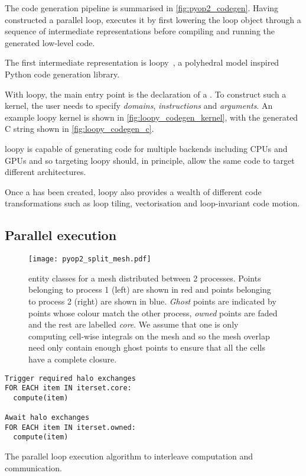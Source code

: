 \documentclass[thesis]{subfiles}
\begin{document}
The code generation pipeline is summarised in \cref{fig:pyop2_codegen}.
Having constructed a parallel loop,  executes it by first lowering the loop object through a sequence of intermediate representations before compiling and running the generated low-level code.

The first intermediate representation is loopy~\cite{klocknerLooPyTransformationbased2014}, a polyhedral model inspired Python code generation library.

With loopy, the main entry point is the declaration of a .
To construct such a kernel, the user needs to specify \textit{domains}, \textit{instructions} and \textit{arguments}.
An example loopy kernel is shown in \cref{fig:loopy_codegen_kernel}, with the generated C string shown in \cref{fig:loopy_codegen_c}.

loopy is capable of generating code for multiple backends including CPUs and GPUs and so  targeting loopy should, in principle, allow the same  code to target different architectures.

Once a  has been created, loopy also provides a wealth of different code transformations such as loop tiling, vectorisation and loop-invariant code motion.

\subsection{Parallel execution}
\label{sec:pyop2_parallel}

\begin{figure}
  \centering
  \texttt{[image: pyop2\_split\_mesh.pdf]}
  \caption{
     entity classes for a mesh distributed between 2 processes.
    Points belonging to process 1 (left) are shown in red and points belonging to process 2 (right) are shown in blue.
    \textit{Ghost} points are indicated by points whose colour match the other process, \textit{owned} points are faded and the rest are labelled \textit{core}.
    We assume that one is only computing cell-wise integrals on the mesh and so the mesh overlap need only contain enough ghost points to ensure that all the cells have a complete closure.
  }
  \label{fig:pyop2_split_mesh}
\end{figure}

\begin{algorithm}
  \begin{verbatim}
Trigger required halo exchanges
FOR EACH item IN iterset.core:
  compute(item)

Await halo exchanges
FOR EACH item IN iterset.owned:
  compute(item)
  \end{verbatim}
  \caption{The  parallel loop execution algorithm to interleave computation and communication.}
  \label{alg:pyop2_comp_comm_overlap}
\end{algorithm}
\end{document}

